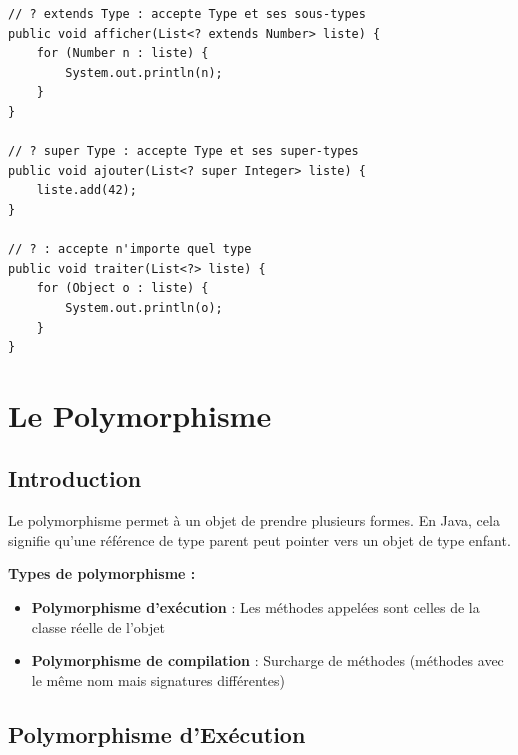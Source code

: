 \documentclass[11pt,a4paper]{article}
\begin{document}
\begin{lstlisting}
// ? extends Type : accepte Type et ses sous-types
public void afficher(List<? extends Number> liste) {
    for (Number n : liste) {
        System.out.println(n);
    }
}

// ? super Type : accepte Type et ses super-types
public void ajouter(List<? super Integer> liste) {
    liste.add(42);
}

// ? : accepte n'importe quel type
public void traiter(List<?> liste) {
    for (Object o : liste) {
        System.out.println(o);
    }
}
\end{lstlisting}

\newpage

\section{Le Polymorphisme}

\subsection{Introduction}

Le polymorphisme permet à un objet de prendre plusieurs formes. En Java, cela signifie qu'une référence de type parent peut pointer vers un objet de type enfant.

\begin{importantbox}
\textbf{Types de polymorphisme :}
\begin{itemize}
    \item \textbf{Polymorphisme d'exécution} : Les méthodes appelées sont celles de la classe réelle de l'objet
    \item \textbf{Polymorphisme de compilation} : Surcharge de méthodes (méthodes avec le même nom mais signatures différentes)
\end{itemize}
\end{importantbox}

\subsection{Polymorphisme d'Exécution}
\end{document}

